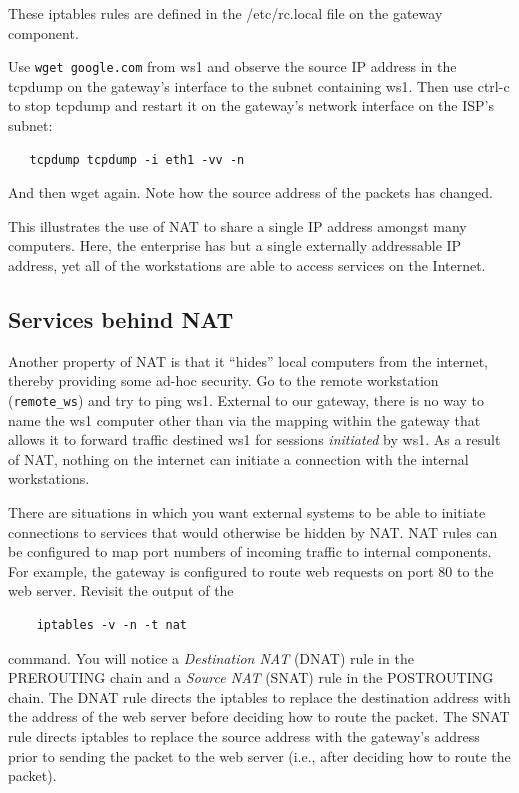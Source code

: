 These iptables rules are defined in the /etc/rc.local file on the gateway component.  

Use {\tt wget google.com} from ws1 and observe the source IP address in the tcpdump on the gateway's interface
to the subnet containing ws1.  Then use ctrl-c to stop tcpdump and restart it on the gateway's
network interface on the ISP's subnet:
\begin{verbatim}
   tcpdump tcpdump -i eth1 -vv -n
\end{verbatim}
\noindent And then wget again.  Note how the source address of the packets has changed.

This illustrates the use of NAT to share a single IP address amongst many computers.  Here,
the enterprise has but a single externally addressable IP address, yet all of the workstations are able to 
access services on the Internet.

\subsection{Services behind NAT}
Another property of NAT is that it ``hides'' local computers from the internet, thereby providing some
ad-hoc security.  Go to the remote workstation
({\tt remote\_ws}) and try to ping ws1.  External to our gateway, there is no way to name the ws1 computer other than
via the mapping within the gateway that allows it to forward traffic destined ws1 for sessions \textit{initiated} by ws1.
As a result of NAT, nothing on the internet can initiate a connection with the internal workstations.  

There are situations in which you want external systems to be able to initiate connections to services that would
otherwise be hidden by NAT.
NAT rules can be configured to map port numbers of incoming traffic to internal components.  For example, the gateway
is configured to route web requests on port 80 to the web server.  Revisit the output of the
\begin{verbatim}
    iptables -v -n -t nat
\end{verbatim}
command. You will notice a \textit{Destination NAT} (DNAT) rule in the PREROUTING chain and 
a \textit{Source NAT} (SNAT) rule in the POSTROUTING chain. 
The DNAT rule directs the iptables to replace the destination address with the address of the web server before
deciding how to route the packet.
The SNAT rule directs iptables to replace the source address with the gateway's address prior to sending
the packet to the web server (i.e., after deciding how to route the packet).

